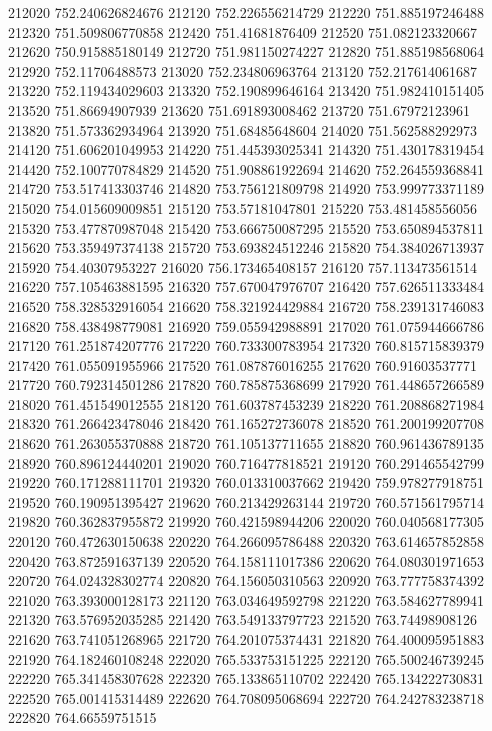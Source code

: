{212020 752.240626824676
212120 752.226556214729
212220 751.885197246488
212320 751.509806770858
212420 751.41681876409
212520 751.082123320667
212620 750.915885180149
212720 751.981150274227
212820 751.885198568064
212920 752.11706488573
213020 752.234806963764
213120 752.217614061687
213220 752.119434029603
213320 752.190899646164
213420 751.982410151405
213520 751.86694907939
213620 751.691893008462
213720 751.67972123961
213820 751.573362934964
213920 751.68485648604
214020 751.562588292973
214120 751.606201049953
214220 751.445393025341
214320 751.430178319454
214420 752.100770784829
214520 751.908861922694
214620 752.264559368841
214720 753.517413303746
214820 753.756121809798
214920 753.999773371189
215020 754.015609009851
215120 753.57181047801
215220 753.481458556056
215320 753.477870987048
215420 753.666750087295
215520 753.650894537811
215620 753.359497374138
215720 753.693824512246
215820 754.384026713937
215920 754.40307953227
216020 756.173465408157
216120 757.113473561514
216220 757.105463881595
216320 757.670047976707
216420 757.626511333484
216520 758.328532916054
216620 758.321924429884
216720 758.239131746083
216820 758.438498779081
216920 759.055942988891
217020 761.075944666786
217120 761.251874207776
217220 760.733300783954
217320 760.815715839379
217420 761.055091955966
217520 761.087876016255
217620 760.91603537771
217720 760.792314501286
217820 760.785875368699
217920 761.448657266589
218020 761.451549012555
218120 761.603787453239
218220 761.208868271984
218320 761.266423478046
218420 761.165272736078
218520 761.200199207708
218620 761.263055370888
218720 761.105137711655
218820 760.961436789135
218920 760.896124440201
219020 760.716477818521
219120 760.291465542799
219220 760.171288111701
219320 760.013310037662
219420 759.978277918751
219520 760.190951395427
219620 760.213429263144
219720 760.571561795714
219820 760.362837955872
219920 760.421598944206
220020 760.040568177305
220120 760.472630150638
220220 764.266095786488
220320 763.614657852858
220420 763.872591637139
220520 764.158111017386
220620 764.080301971653
220720 764.024328302774
220820 764.156050310563
220920 763.777758374392
221020 763.393000128173
221120 763.034649592798
221220 763.584627789941
221320 763.576952035285
221420 763.549133797723
221520 763.74498908126
221620 763.741051268965
221720 764.201075374431
221820 764.400095951883
221920 764.182460108248
222020 765.533753151225
222120 765.500246739245
222220 765.341458307628
222320 765.133865110702
222420 765.134222730831
222520 765.001415314489
222620 764.708095068694
222720 764.242783238718
222820 764.66559751515
}
